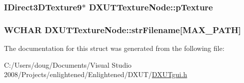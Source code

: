 \label{struct_d_x_u_t_texture_node_ae56b4afef5842ee40f2dd4c228b3b71d}
\hypertarget{struct_d_x_u_t_texture_node_ac1c5b89eba3bd2883f9d346dae96b1b1}{
\subsubsection[{pTexture}]{\setlength{\rightskip}{0pt plus 5cm}IDirect3DTexture9$\ast$ {\bf DXUTTextureNode::pTexture}}}
\label{struct_d_x_u_t_texture_node_ac1c5b89eba3bd2883f9d346dae96b1b1}
\hypertarget{struct_d_x_u_t_texture_node_af2e55954d921b023c968ae84e72d907d}{
\subsubsection[{strFilename}]{\setlength{\rightskip}{0pt plus 5cm}WCHAR {\bf DXUTTextureNode::strFilename}\mbox{[}MAX\_\-PATH\mbox{]}}}
\label{struct_d_x_u_t_texture_node_af2e55954d921b023c968ae84e72d907d}


The documentation for this struct was generated from the following file:\begin{DoxyCompactItemize}
\item 
C:/Users/doug/Documents/Visual Studio 2008/Projects/enlightened/Enlightened/DXUT/\hyperlink{_d_x_u_tgui_8h}{DXUTgui.h}\end{DoxyCompactItemize}
